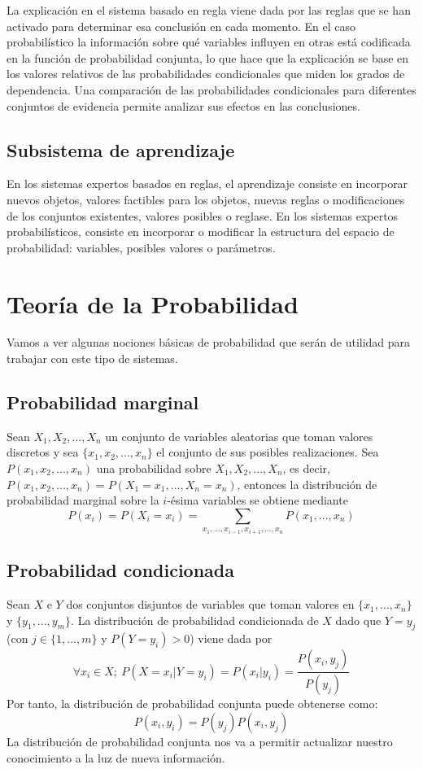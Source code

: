 \documentclass{article}
\begin{document}
La explicación en el sistema basado en regla viene dada por las reglas que se han activado para determinar esa conclusión en cada momento. En el caso probabilístico la información sobre qué variables influyen en otras está codificada en la función de probabilidad conjunta, lo que hace que la explicación se base en los valores relativos de las probabilidades condicionales que miden los grados de dependencia. Una comparación de las probabilidades condicionales para diferentes conjuntos de evidencia permite analizar sus efectos en las conclusiones.

\subsection{Subsistema de aprendizaje}

En los sistemas expertos basados en reglas, el aprendizaje consiste en incorporar nuevos objetos, valores factibles para los objetos, nuevas reglas o modificaciones de los conjuntos existentes, valores posibles o reglase. En los sistemas expertos probabilísticos, consiste en incorporar o modificar la estructura del espacio de probabilidad: variables, posibles valores o parámetros.

\section{Teoría de la Probabilidad}
Vamos a ver algunas nociones básicas de probabilidad que serán de utilidad para trabajar con este tipo de sistemas.

\subsection{Probabilidad marginal}
Sean $X_1,X_2,...,X_n$ un conjunto de variables aleatorias que toman valores discretos y sea $\{x_1,x_2,...,x_n\}$ el conjunto de sus posibles realizaciones. Sea $P(x_1,x_2,...,x_n)$ una probabilidad sobre $X_1,X_2,...,X_n$, es decir, $P(x_1,x_2,...,x_n) = P(X_1 = x_1,...,X_n=x_n)$, entonces la distribución de probabilidad marginal sobre la $i$-ésima variables se obtiene mediante
\[	P(x_i) = P(X_i=x_i) = \sum_{x_1,...,x_{i-1},x_{i+1},...,x_n}P(x_1,...,x_n)	\]

\subsection{Probabilidad condicionada}
Sean $X$ e $Y$ dos conjuntos disjuntos de variables que toman valores en $\{x_1,...,x_n\}$ y $\{y_1,...,y_m\}$. La distribución de probabilidad condicionada de $X$ dado que $Y=y_j$ (con $j \in \{1,...,m\}$ y $P(Y=y_i)>0$) viene dada por
\[	\forall x_i \in X;\ P(X=x_i|Y=y_i)=P(x_i|y_i)=\frac{P(x_i,y_j)}{P(y_j)}	\]
Por tanto, la distribución de probabilidad conjunta puede obtenerse como:
\[	P(x_i,y_i)=P(y_j)P(x_i,y_j)	\]
La distribución de probabilidad conjunta nos va a permitir actualizar nuestro conocimiento a la luz de nueva información.
\end{document}
